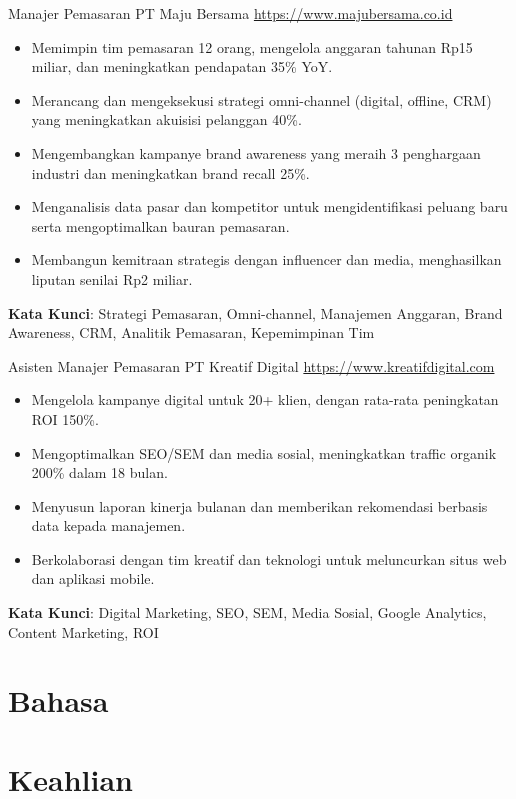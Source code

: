 \documentclass[a4paper, serif, 10pt]{moderncv}
\begin{document}
        {Manajer Pemasaran}
        {PT Maju Bersama}
        {\url{https://www.majubersama.co.id}}
        {}
        {\begin{itemize}
\item Memimpin tim pemasaran 12 orang, mengelola anggaran tahunan Rp15 miliar, dan meningkatkan pendapatan 35\% YoY.
\item Merancang dan mengeksekusi strategi omni-channel (digital, offline, CRM) yang meningkatkan akuisisi pelanggan 40\%.
\item Mengembangkan kampanye brand awareness yang meraih 3 penghargaan industri dan meningkatkan brand recall 25\%.
\item Menganalisis data pasar dan kompetitor untuk mengidentifikasi peluang baru serta mengoptimalkan bauran pemasaran.
\item Membangun kemitraan strategis dengan influencer dan media, menghasilkan liputan senilai Rp2 miliar.
\end{itemize}
\textbf{Kata Kunci}: Strategi Pemasaran, Omni-channel, Manajemen Anggaran, Brand Awareness, CRM, Analitik Pemasaran, Kepemimpinan Tim}

        {Asisten Manajer Pemasaran}
        {PT Kreatif Digital}
        {\url{https://www.kreatifdigital.com}}
        {}
        {\begin{itemize}
\item Mengelola kampanye digital untuk 20+ klien, dengan rata-rata peningkatan ROI 150\%.
\item Mengoptimalkan SEO/SEM dan media sosial, meningkatkan traffic organik 200\% dalam 18 bulan.
\item Menyusun laporan kinerja bulanan dan memberikan rekomendasi berbasis data kepada manajemen.
\item Berkolaborasi dengan tim kreatif dan teknologi untuk meluncurkan situs web dan aplikasi mobile.
\end{itemize}
\textbf{Kata Kunci}: Digital Marketing, SEO, SEM, Media Sosial, Google Analytics, Content Marketing, ROI}
\section{Bahasa}

\section{Keahlian}
\end{document}
